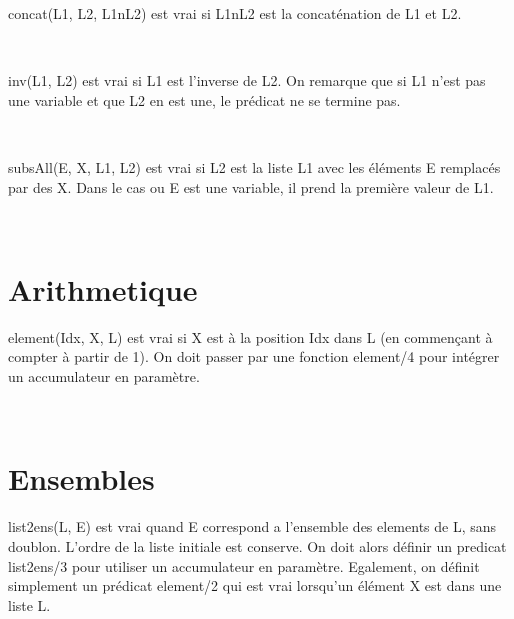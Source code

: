 \documentclass[a4paper, 11pt]{article}
\newenvironment{DDbox}[1]{
\begin{lrbox}{\BBbox}\begin{minipage}{\linewidth}}
{\end{minipage}\end{lrbox}\noindent\colorbox{Zgris}{\usebox{\BBbox}} \\
[.5cm]}
\begin{document}
concat(L1, L2, L1nL2) est vrai si L1nL2 est la concaténation de L1
et L2. \\
\begin{DDbox}{\linewidth}
    
\end{DDbox}

inv(L1, L2) est vrai si L1 est l'inverse de L2. On remarque que si
L1 n'est pas une variable et que L2 en est une, le prédicat ne se
termine pas. \\
\begin{DDbox}{\linewidth}
    
\end{DDbox}

subsAll(E, X, L1, L2) est vrai si L2 est la liste L1 avec les
éléments E remplacés par des X. Dans le cas ou E est une variable,
il prend la première valeur de L1. \\
\begin{DDbox}{\linewidth}
    
\end{DDbox}

%     

\newpage
\section{Arithmetique}
element(Idx, X, L) est vrai si X est à la position Idx dans L (en
commençant à compter à partir de 1). On doit passer par une
fonction element/4 pour intégrer un accumulateur en paramètre. \\
\begin{DDbox}{\linewidth}
    
\end{DDbox}

%     

\newpage
\section{Ensembles}
list2ens(L, E) est vrai quand E correspond a l'ensemble des
elements de L, sans doublon. L'ordre de la liste initiale est
conserve.  On doit alors définir un predicat list2ens/3 pour
utiliser un accumulateur en paramètre. Egalement, on définit
simplement un prédicat element/2 qui est vrai lorsqu'un élément X
est dans une liste L. \\
\begin{DDbox}{\linewidth}
    
\end{DDbox}
\end{document}
